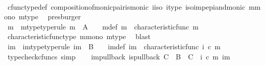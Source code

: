 \begin{isabellebody}
\ \ \ \ \isamarkupfalse%
\ cfunc{\isacharunderscore}{\kern0pt}type{\isacharunderscore}{\kern0pt}def\ composition{\isacharunderscore}{\kern0pt}of{\isacharunderscore}{\kern0pt}monic{\isacharunderscore}{\kern0pt}pair{\isacharunderscore}{\kern0pt}is{\isacharunderscore}{\kern0pt}monic\ i{\isacharunderscore}{\kern0pt}iso\ i{\isacharunderscore}{\kern0pt}type\ iso{\isacharunderscore}{\kern0pt}imp{\isacharunderscore}{\kern0pt}epi{\isacharunderscore}{\kern0pt}and{\isacharunderscore}{\kern0pt}monic\ m{\isacharunderscore}{\kern0pt}mono\ m{\isacharunderscore}{\kern0pt}type\ \isamarkupfalse%
\ presburger\isanewline
\ \ \isamarkupfalse%
\ {\isasymchi}m\ \ {\isasymchi}m{\isacharunderscore}{\kern0pt}type{\isacharbrackleft}{\kern0pt}type{\isacharunderscore}{\kern0pt}rule{\isacharbrackright}{\kern0pt}{\isacharcolon}{\kern0pt}\ {\isachardoublequoteopen}{\isasymchi}m\ {\isacharcolon}{\kern0pt}\ A\ {\isasymrightarrow}\ {\isasymOmega}{\isachardoublequoteclose}\ \ {\isasymchi}m{\isacharunderscore}{\kern0pt}def{\isacharcolon}{\kern0pt}\ {\isachardoublequoteopen}{\isasymchi}m\ {\isacharequal}{\kern0pt}\ characteristic{\isacharunderscore}{\kern0pt}func\ m{\isachardoublequoteclose}\isanewline
\ \ \ \ \isamarkupfalse%
\ characteristic{\isacharunderscore}{\kern0pt}func{\isacharunderscore}{\kern0pt}type\ m{\isacharunderscore}{\kern0pt}mono\ m{\isacharunderscore}{\kern0pt}type\ \isamarkupfalse%
\ blast\isanewline
\ \ \isamarkupfalse%
\ {\isasymchi}im\ \ {\isasymchi}im{\isacharunderscore}{\kern0pt}type{\isacharbrackleft}{\kern0pt}type{\isacharunderscore}{\kern0pt}rule{\isacharbrackright}{\kern0pt}{\isacharcolon}{\kern0pt}\ {\isachardoublequoteopen}{\isasymchi}im\ {\isacharcolon}{\kern0pt}\ B\ {\isasymrightarrow}\ {\isasymOmega}{\isachardoublequoteclose}\ \ {\isasymchi}im{\isacharunderscore}{\kern0pt}def{\isacharcolon}{\kern0pt}\ {\isachardoublequoteopen}{\isasymchi}im\ {\isacharequal}{\kern0pt}\ characteristic{\isacharunderscore}{\kern0pt}func\ {\isacharparenleft}{\kern0pt}i\ {\isasymcirc}\isactrlsub c\ m{\isacharparenright}{\kern0pt}{\isachardoublequoteclose}\isanewline
\ \ \ \ \isamarkupfalse%
\ {\isacharparenleft}{\kern0pt}typecheck{\isacharunderscore}{\kern0pt}cfuncs{\isacharcomma}{\kern0pt}\ simp{\isacharparenright}{\kern0pt}\isanewline
\ \ \isamarkupfalse%
\ {\isasymchi}im{\isacharunderscore}{\kern0pt}pullback{\isacharcolon}{\kern0pt}\ {\isachardoublequoteopen}is{\isacharunderscore}{\kern0pt}pullback\ C\ {\isasymone}\ B\ {\isasymOmega}\ {\isacharparenleft}{\kern0pt}{\isasymbeta}\isactrlbsub C\isactrlesub {\isacharparenright}{\kern0pt}\ {\isasymt}\ {\isacharparenleft}{\kern0pt}i\ {\isasymcirc}\isactrlsub c\ m{\isacharparenright}{\kern0pt}\ {\isasymchi}im{\isachardoublequoteclose}\isanewline

\end{isabellebody}
